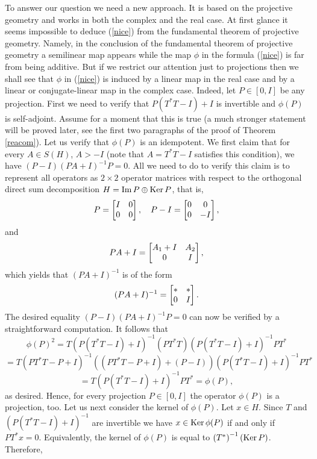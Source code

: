 \documentclass{article}
\begin{document}
To answer our question we need a new approach. It is based on the projective geometry and works in both the complex and the real case.
At first glance it seems impossible to deduce (\ref{nice}) from the fundamental theorem of projective geometry. Namely, in the conclusion of the fundamental theorem of projective geometry a semilinear map appears while the map $\phi$ in the formula (\ref{nice}) is far from being additive. But if we restrict our attention just to projections then we shall see that $\phi$ in (\ref{nice}) is induced by a linear map in the real case and by a linear or conjugate-linear map in the complex case. Indeed, let $P \in [0,I]$ be any projection. First we need to verify that $P(T^\ast T -I) +I$ is invertible and $\phi (P)$ is self-adjoint. Assume for a moment that this is true (a much stronger statement will be proved later, see the first two paragraphs of the proof of Theorem \ref{reacom}).     Let us verify that $\phi (P)$ is an idempotent. We first claim that for every $A  \in S(H)$, $A > -I$ (note that $A = T^\ast T -I$ satisfies this condition), we have $(P-I)(PA+I)^{-1}P= 0$. All we need to do to verify this claim is to represent all operators as $2\times 2$ operator matrices with respect to the orthogonal direct sum decomposition $H = {\rm Im}\, P \oplus {\rm Ker}\, P$, that is,
$$
P= \left[ \begin{matrix} I & 0 \cr 0 & 0 \cr \end{matrix} \right] , \ \ \  P-I = \left[ \begin{matrix} 0 & 0 \cr 0 & -I \cr \end{matrix} \right] ,
$$  
and
$$
PA  + I = \left[ \begin{matrix} A_1 + I & A_2 \cr 0 & I \cr \end{matrix} \right],
$$
which yields that $(PA+I)^{-1}$ is of the form
$$
(PA+I)^{-1} =  \left[ \begin{matrix} * & * \cr 0 & I \cr \end{matrix} \right]. 
$$
The desired equality $(P-I)(PA+I)^{-1}P= 0$ can now be verified by a straightforward computation. It follows that
$$
\phi (P)^2 =  T \left( P (T^\ast T -I) +I \right)^{-1} (P T^\ast  T) \left( P (T^\ast T -I) +I \right)^{-1} P T^\ast
$$
$$
=  T \left( P T^\ast T -P +I \right)^{-1}( (P T^\ast  T -P +I) +(P-I)) \left( P (T^\ast T -I) +I \right)^{-1} P T^\ast
$$
$$
=  T  \left( P (T^\ast T -I) +I \right)^{-1} P T^\ast = \phi (P),
$$
as desired. Hence, for every projection $P \in [0,I]$ the operator $\phi (P)$ is a projection, too.
Let us next consider the kernel of $\phi (P)$. Let $x \in H$. Since $T$ and $ \left( P (T^\ast T -I) +I \right)^{-1}$ are invertible we have $x \in {\rm Ker}\, \phi (P)$ if and only if $PT^\ast x = 0$. Equivalently, the kernel of $\phi (P)$ is equal to $\left( T^\ast \right)^{-1} ({\rm Ker}\, P)$. Therefore,
\end{document}
